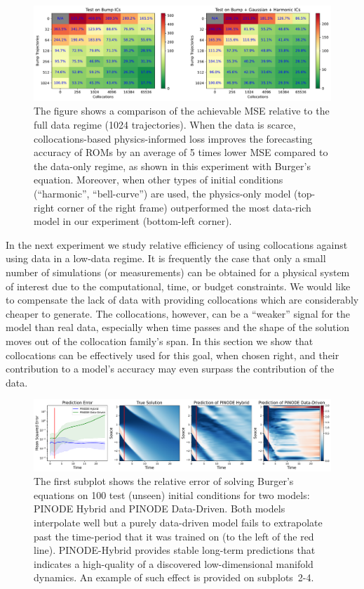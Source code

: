 \begin{figure}
    \centering
    \includegraphics[width=\textwidth]{figures/data_vs_collocations.pdf}
    \caption{The figure shows a comparison of the achievable MSE relative to the full data regime (1024 trajectories). When the data is scarce, collocations-based physics-informed loss improves the forecasting accuracy of ROMs by an average of 5 times lower MSE compared to the data-only regime, as shown in this experiment with Burger's equation. Moreover, when other types of initial conditions (``harmonic'', ``bell-curve'') are used, the physics-only model (top-right corner of the right frame) outperformed the most data-rich model in our experiment (bottom-left corner). }
    \label{fig:burger_data_vs_collocations}
\end{figure}

In the next experiment we study relative efficiency of using collocations against using data in a low-data regime. It is frequently the case that only a small number of simulations (or measurements) can be obtained for a physical system of interest due to the computational, time, or budget constraints. We would like to compensate the lack of data with providing collocations which are considerably cheaper to generate. The collocations, however, can be a ``weaker'' signal for the model than real data, especially when time passes and the shape of the solution moves out of the collocation family's span. In this section we show that collocations can be effectively used for this goal, when chosen right, and their contribution to a model's accuracy may even surpass the contribution of the data. 


\begin{figure}
    \centering
    \includegraphics[width=\textwidth]{figures/example_burgers.pdf}
    \caption{The first subplot shows the relative error of solving Burger's equations on 100 test (unseen) initial conditions for two models: PINODE Hybrid and PINODE Data-Driven. Both models interpolate well but a purely data-driven model fails to extrapolate past the time-period that it was trained on (to the left of the red line). PINODE-Hybrid provides stable long-term predictions that indicates a high-quality of a discovered low-dimensional manifold dynamics. An example of such effect is provided on subplots~2-4.}
    \label{fig:burgers_example}
\end{figure}

